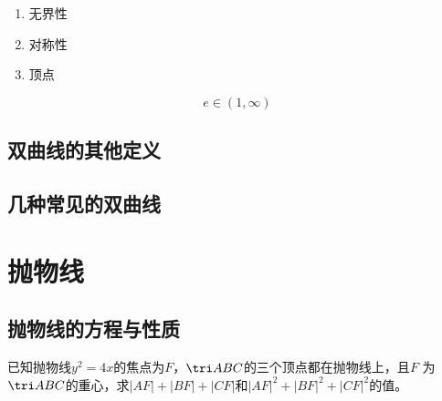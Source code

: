 \begin{character}[双曲线的性质]
\begin{enumerate}[(1)]
    \item 无界性
    \item 对称性
    \item 顶点
\end{enumerate}
\end{character}

\begin{theorem}[双曲线的离心率]
    \begin{equation}
        e\in (1,\infty)
    \end{equation}

\end{theorem}

\begin{definition}[通径]
    
\end{definition}

\clearpage
\clearpage
\subsection{双曲线的其他定义}
\clearpage
\clearpage
\subsection{几种常见的双曲线}
\clearpage

\section{抛物线}
\subsection{抛物线的方程与性质}

\begin{example}
    已知抛物线\(y^2=4x\)的焦点为\(F\)，\(\tri ABC\)的三个顶点都在抛物线上，且\(F\)
    为\(\tri ABC\)的重心，求\(|AF|+|BF|+|CF|\)和\(|AF|^2+|BF|^2+|CF|^2\)的值。
\end{example}









